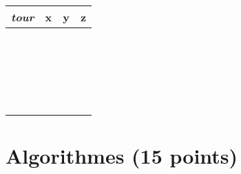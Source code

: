 \documentclass[11pt,a4paper]{article}
\begin{document}
\begin{table}[!ht]
\begin{minipage}{0.4\textwidth}
    \begin{tabular}{| C{1cm} | C{1cm} | C{1cm} | C{1cm} |}
        \hline
   \textit{tour}  &  \textbf{x}  &  \textbf{y}  &  \textbf{z}    \\
        \hline
                  &     &     &       \\
                  &     &     &       \\
                  &     &     &       \\
        \hline
                  &     &     &       \\
                  &     &     &       \\
                  &     &     &       \\
        \hline
                  &     &     &       \\
                  &     &     &       \\
                  &     &     &       \\
        \hline
                  &     &     &       \\
                  &     &     &       \\
                  &     &     &       \\
        \hline
                  &     &     &       \\
                  &     &     &       \\
                  &     &     &       \\
        \hline
                  &     &     &       \\
                  &     &     &       \\
                  &     &     &       \\
        \hline
                  &     &     &       \\
                  &     &     &       \\
                  &     &     &       \\
        \hline
    \end{tabular}
  \end{minipage}

\end{table}




\clearpage

\section{Algorithmes (15 points)}
\end{document}
